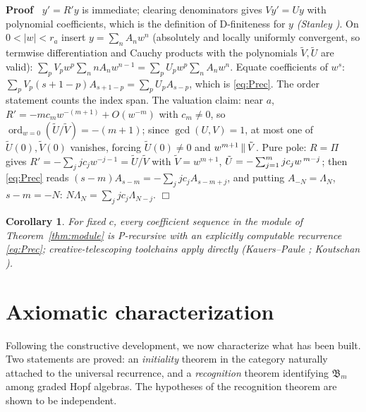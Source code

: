 \documentclass{article}
\newcommand{\tmem}[1]{{\em #1\/}}
\newcommand{\tmop}[1]{\ensuremath{\operatorname{#1}}}
\newenvironment{proof}{\noindent\textbf{Proof\ }}{\hspace*{\fill}$\Box$\medskip}
\newtheorem{corollary}{Corollary}
\newcommand{\ord}{\tmop{ord}}
\newcommand{\CA}{\mathfrak{B}}
\begin{document}
\begin{proof}
  $y' = R' y$ is immediate; clearing denominators gives $Vy' = Uy$ with
  polynomial coefficients, which is the definition of D-finiteness for $y$
  {\tmem{(Stanley {\cite{StanleyDF}})}}. On $0 < |w| < r_a$ insert $y = \sum_n
  A_n w^n$ (absolutely and locally uniformly convergent, so termwise
  differentiation and Cauchy products with the polynomials $\tilde{V},
  \tilde{U}$ are valid): $\sum_p V_p w^p  \sum_n nA_n w^{n - 1} = \sum_p U_p
  w^p  \sum_n A_n w^n$. Equate coefficients of $w^s$: $\sum_p V_p  (s + 1 - p)
  A_{s + 1 - p} = \sum_p U_p A_{s - p}$, which is \eqref{eq:Prec}. The order
  statement counts the index span. The valuation claim: near $a$, $R' = - mc_m
  w^{- (m + 1)} + O (w^{- m})$ with $c_m \ne 0$, so $\ord_{w = 0} (\tilde{U} /
  \tilde{V}) = - (m + 1)$; since $\gcd (U, V) = 1$, at most one of $\tilde{U}
  (0), \tilde{V} (0)$ vanishes, forcing $\tilde{U} (0) \ne 0$ and $w^{m + 1}
  \hspace{0.17em} \| \hspace{0.17em} \tilde{V}$. Pure pole: $R = \Pi$ gives
  $R' = - \sum_j jc_j w^{- j - 1} = \tilde{U} / \tilde{V}$ with $\tilde{V} =
  w^{m + 1}$, $\tilde{U} = - \sum_{j = 1}^m jc_j w^{\hspace{0.17em} m - j}$;
  then \eqref{eq:Prec} reads $(s - m) A_{s - m} = - \sum_j jc_j A_{s - m +
  j}$, and putting $A_{- N} = \Lambda_N$, $s - m = - N$: $N \Lambda_N = \sum_j
  jc_j \Lambda_{N - j}$.
\end{proof}

\begin{corollary}
  \label{cor:algorithmicholonomy}For fixed $c$, every coefficient sequence in
  the module of Theorem~\ref{thm:module} is P-recursive with an explicitly
  computable recurrence \eqref{eq:Prec}; creative-telescoping toolchains apply
  directly {\tmem{(Kauers--Paule {\cite{KauersPaule}}; Koutschan
  {\cite{Koutschan}})}}.
\end{corollary}

\section{Axiomatic characterization}\label{sec:axioms}

Following the constructive development, we now characterize what has been
built. Two statements are proved: an {\tmem{initiality}} theorem in the
category naturally attached to the universal recurrence, and a
{\tmem{recognition}} theorem identifying $\CA_m$ among graded Hopf algebras.
The hypotheses of the recognition theorem are shown to be independent.
\end{document}
